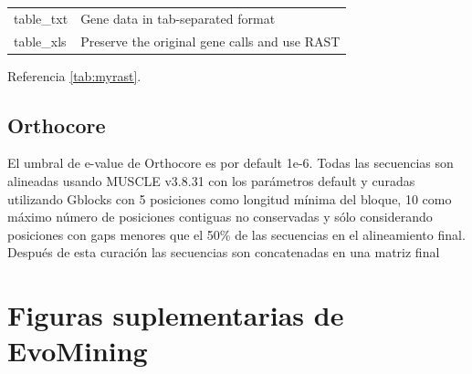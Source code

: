 \documentclass[12pt,twoside]{reedthesis}
\begin{document}
\begin{longtable}[]{@{}ll@{}}
  \begin{minipage}[t]{0.22\columnwidth}\raggedright\strut
  table\_txt\strut
  \end{minipage} & \begin{minipage}[t]{0.72\columnwidth}\raggedright\strut
  Gene data in tab-separated format\strut
  \end{minipage}\tabularnewline
  \begin{minipage}[t]{0.22\columnwidth}\raggedright\strut
  table\_xls\strut
  \end{minipage} & \begin{minipage}[t]{0.72\columnwidth}\raggedright\strut
  Preserve the original gene calls and use RAST\strut
  \end{minipage}\tabularnewline
  \bottomrule
  \end{longtable}
  
  Referencia \autoref{tab:myrast}.
  
  \section{Orthocore}\label{orthocore}
  
  El umbral de e-value de Orthocore es por default 1e-6. Todas las
  secuencias son alineadas usando MUSCLE v3.8.31 con los parámetros
  default y curadas utilizando Gblocks con 5 posiciones como longitud
  mínima del bloque, 10 como máximo número de posiciones contiguas no
  conservadas y sólo considerando posiciones con gaps menores que el 50\%
  de las secuencias en el alineamiento final. Después de esta curación las
  secuencias son concatenadas en una matriz final
  
  \appendix
  
  \chapter{Figuras suplementarias de
  EvoMining}\label{figuras-suplementarias-de-evomining}
  
\end{document}
